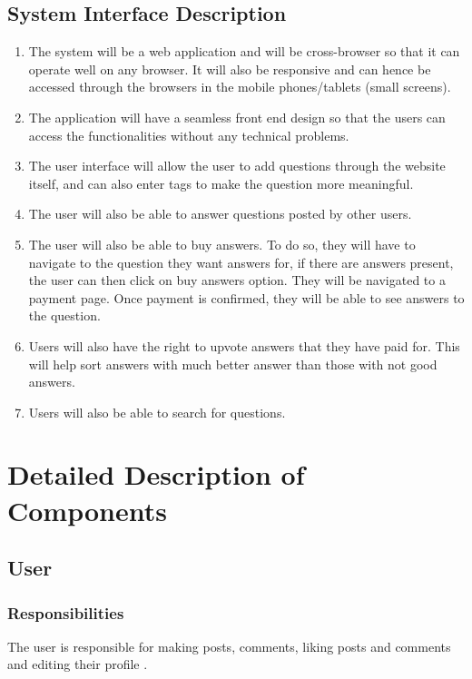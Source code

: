 \documentclass[12pt]{article}
\begin{document}
\subsection{System Interface Description}
\begin{enumerate}
    \item The system will be a web application and will be cross-browser so that it can operate well on any browser. It will also be responsive and can hence be accessed through the browsers in the mobile phones/tablets (small screens).
    
    \item The application will have a seamless front end design so that the users can access the functionalities without any technical problems.
    
    \item The user interface will allow the user to add questions through the website itself, and can also enter tags to make the question more meaningful. 
    
    \item The user will also be able to answer questions posted by other users. 
    
    \item The user will also be able to buy answers. To do so, they will have to navigate to the question they want answers for, if there are answers present, the user can then click on buy answers option. They will be navigated to a payment page. Once payment is confirmed, they will be able to see answers to the question. 
    
    \item Users will also have the right to upvote answers that they have paid for. This will help sort answers with much better answer than those with not good answers. 
    
    \item Users will also be able  to search for questions. 
\end{enumerate}

\section{Detailed Description of Components}

\subsection{User}
\subsubsection{Responsibilities}
The user is responsible for making posts, comments, liking posts and comments and editing their profile .
\end{document}

